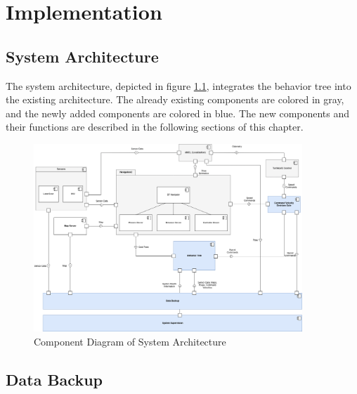 \chapter{Implementation}
\label{cha:implementierung}

\section{System Architecture}

The system architecture, depicted in figure \ref{fig:component_diagram}, integrates the behavior tree into the existing architecture. The already existing components are colored in gray, and the newly added components are colored in blue. The new components and their functions are described in the following sections of this chapter. 


\begin{figure}[ht]
	\centering
	\includegraphics[width=0.9\textwidth]{images/component_diagram_bt.png}
	\caption{Component Diagram of System Architecture}
	\label{fig:component_diagram}
\end{figure}

\section{Data Backup}


